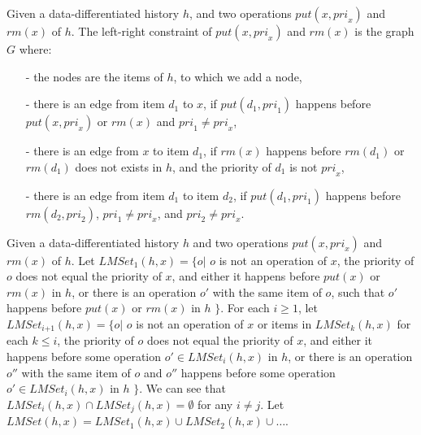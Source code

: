 \documentclass{llncs}
\begin{document}
\begin{definition}\label{def:left-right constraint for matched put and rm operations}
Given a data-differentiated history $h$, and two operations $\textit{put}(x,\textit{pri}_x)$ and $\textit{rm}(x)$ of $h$. The left-right constraint of $\textit{put}(x,\textit{pri}_x)$ and $\textit{rm}(x)$ is the graph $G$ where:

\begin{itemize}
\setlength{\itemsep}{0.5pt}
\item[-] the nodes are the items of $h$, to which we add a node,

\item[-] there is an edge from item $d_1$ to $x$, if $\textit{put}(d_1,\textit{pri}_1)$ happens before $\textit{put}(x,\textit{pri}_x)$ or $\textit{rm}(x)$ and $\textit{pri}_1 \neq \textit{pri}_x$,

\item[-] there is an edge from $x$ to item $d_1$, if $\textit{rm}(x)$ happens before $\textit{rm}(d_1)$ or $\textit{rm}(d_1)$ does not exists in $h$, and the priority of $d_1$ is not $\textit{pri}_x$,

\item[-] there is an edge from item $d_1$ to item $d_2$, if $\textit{put}(d_1,\textit{pri}_1)$ happens before $\textit{rm}(d_2,\textit{pri}_2)$, $\textit{pri}_1 \neq \textit{pri}_x$, and $\textit{pri}_2 \neq \textit{pri}_x$.
\end{itemize}
\end{definition}

Given a data-differentiated history $h$ and two operations $\textit{put}(x,\textit{pri}_x)$ and $\textit{rm}(x)$ of $h$. Let $\textit{LMSet}_1(h,x) = \{ o \vert$ $o$ is not an operation of $x$, the priority of $o$ does not equal the priority of $x$, and either it happens before $\textit{put}(x)$ or $\textit{rm}(x)$ in $h$, or there is an operation $o'$ with the same item of $o$, such that $o'$ happens before $\textit{put}(x)$ or $\textit{rm}(x)$ in $h$ $\}$. For each $i \geq 1$, let $\textit{LMSet}_{\textit{i+1}}(h,x) = \{ o \vert$ $o$ is not an operation of $x$ or items in $\textit{LMSet}_k(h,x)$ for each $k \leq i$, the priority of $o$ does not equal the priority of $x$, and either it happens before some operation $o' \in \textit{LMSet}_i(h,x)$ in $h$, or there is an operation $o''$ with the same item of $o$ and $o''$ happens before some operation $o' \in \textit{LMSet}_i(h,x)$ in $h$ $\}$. %
We can see that $\textit{LMSet}_i(h,x) \cap \textit{LMSet}_j(h,x) = \emptyset$ for any $i \neq j$. Let $\textit{LMSet}(h,x) = \textit{LMSet}_1(h,x) \cup \textit{LMSet}_2(h,x) \cup \ldots$. %
\end{document}
